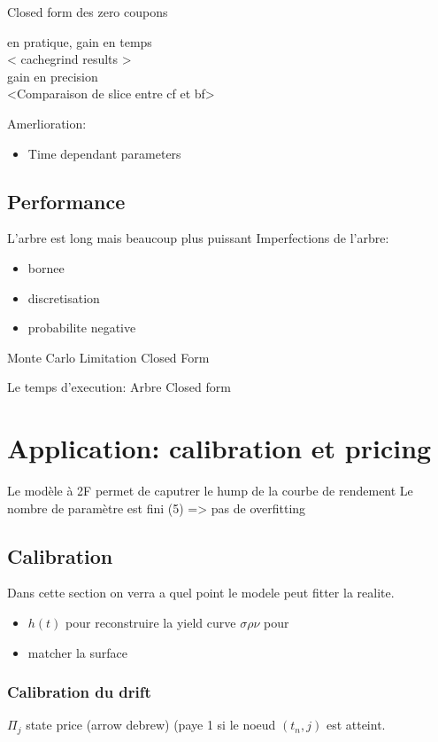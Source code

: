 \documentclass[paper=a4, fontsize=11pt]{scrartcl}
\numberwithin{equation}{section}		%
\numberwithin{figure}{section}			%
\numberwithin{table}{section}				%
\theoremstyle{definition}
\begin{document}
Closed form des zero coupons

en pratique, gain en temps \\
< cachegrind results > \\

gain en precision \\
<Comparaison de slice entre cf et bf>


Amerlioration:
\begin{itemize}
\item Time dependant parameters
\end{itemize}

\subsection{Performance}
L'arbre est long mais beaucoup plus puissant
Imperfections de l'arbre:
\begin{itemize}
\item  bornee
\item  discretisation
\item  probabilite negative
\end{itemize}
Monte Carlo
Limitation
Closed Form

Le temps d'execution:
Arbre
Closed form

\newpage
\section{Application: calibration et pricing}
Le modèle à 2F permet de caputrer le hump de la courbe de rendement
Le nombre de paramètre est fini (5) => pas de overfitting


\subsection{Calibration}
Dans cette section on verra a quel point le modele peut fitter la realite.

\begin{itemize}
\item $h(t)$ pour reconstruire la yield curve $\sigma \rho \nu$ pour
\item  matcher la surface
\end{itemize}

\subsubsection{Calibration du drift}

$\Pi_j$ state price (arrow debrew) (paye 1 si le noeud $(t_n, j)$ est atteint.
\end{document}
